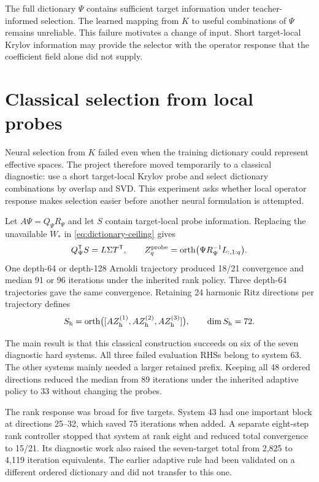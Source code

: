 The full dictionary $\Psi$ contains sufficient target information under teacher-informed selection. The learned mapping from $K$ to useful combinations of $\Psi$ remains unreliable. This failure motivates a change of input. Short target-local Krylov information may provide the selector with the operator response that the coefficient field alone did not supply.

\section{Classical selection from local probes}
\label{sec:local-probes}

Neural selection from $K$ failed even when the training dictionary could represent effective spaces. The project therefore moved temporarily to a classical diagnostic: use a short target-local Krylov probe and select dictionary combinations by overlap and SVD. This experiment asks whether local operator response makes selection easier before another neural formulation is attempted.

Let $A\Psi=Q_\Psi R_\Psi$ and let $S$ contain target-local probe information. Replacing the unavailable $W_*$ in \cref{eq:dictionary-ceiling} gives
\begin{equation}
 Q_\Psi^{\mathsf T} S=L\Sigma T^{\mathsf T},
 \qquad
 Z_q^{\rm probe}=\operatorname{orth}\bigl(\Psi R_\Psi^{-1}L_{:,1:q}\bigr).
 \label{eq:probe-selection}
\end{equation}
One depth-64 or depth-128 Arnoldi trajectory produced 18/21 convergence and median 91 or 96 iterations under the inherited rank policy. Three depth-64 trajectories gave the same convergence. Retaining 24 harmonic Ritz directions per trajectory defines
\begin{equation}
 S_{\rm h}=\operatorname{orth}\bigl([AZ_{\rm h}^{(1)},AZ_{\rm h}^{(2)},AZ_{\rm h}^{(3)}]\bigr),
 \qquad \dim S_{\rm h}=72.
 \label{eq:harmonic-information}
\end{equation}

The main result is that this classical construction succeeds on six of the seven diagnostic hard systems. All three failed evaluation RHSs belong to system 63. The other systems mainly needed a larger retained prefix. Keeping all 48 ordered directions reduced the median from 89 iterations under the inherited adaptive policy to 33 without changing the probes.



The rank response was broad for five targets. System 43 had one important block at directions 25--32, which saved 75 iterations when added. A separate eight-step rank controller stopped that system at rank eight and reduced total convergence to 15/21. Its diagnostic work also raised the seven-target total from 2,825 to 4,119 iteration equivalents. The earlier adaptive rule had been validated on a different ordered dictionary and did not transfer to this one.


